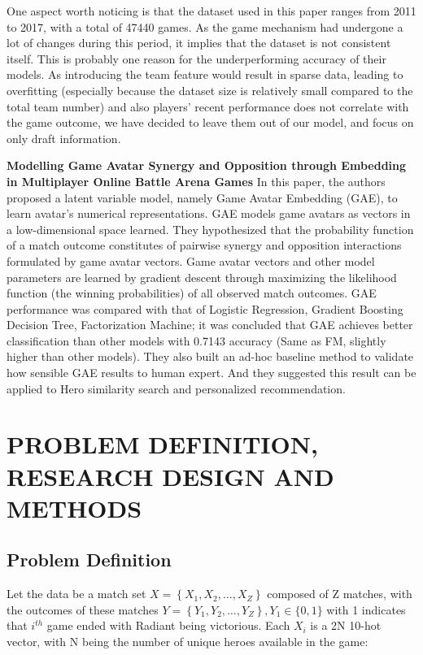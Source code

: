 \documentclass{article}
\begin{document}
One aspect worth noticing is that the dataset used in this paper ranges from 2011 to 2017, with a total of 47440 games. As the game mechanism had undergone a lot of changes during this period, it implies that the dataset is not consistent itself. This is probably one reason for the underperforming accuracy of their models. As introducing the team feature would result in sparse data, leading to overfitting (especially because the dataset size is relatively small compared to the total team number) and also players’ recent performance does not correlate with the game outcome, we have decided to leave them out of our model, and focus on only draft information.

\textbf{Modelling Game Avatar Synergy and Opposition through Embedding in Multiplayer Online Battle Arena Games\cite{chen2018modeling}}
In this paper, the authors proposed a latent variable model, namely Game Avatar Embedding (GAE), to learn avatar’s numerical representations. GAE models game avatars as vectors in a low-dimensional space learned. They hypothesized that the probability function of a match outcome constitutes of pairwise synergy and opposition interactions formulated by game avatar vectors. Game avatar vectors and other model parameters are learned by gradient descent through maximizing the likelihood function (the winning probabilities) of all observed match outcomes. GAE performance was compared with that of Logistic Regression, Gradient Boosting Decision Tree, Factorization Machine; it was concluded that GAE achieves better classification than other models with 0.7143 accuracy (Same as FM, slightly higher than other models). They also built an ad-hoc baseline method to validate how sensible GAE results to human expert. And they suggested this result can be applied to Hero similarity search and personalized recommendation.

\section{PROBLEM DEFINITION, RESEARCH DESIGN AND METHODS}

\subsection{Problem Definition}
Let the data be a match set $X = \left\{ X _ { 1 } , X _ { 2 } , \dots , X _ { Z } \right\}$ composed of Z matches, with the outcomes of these matches $Y = \left\{ Y _ { 1 } , Y _ { 2 } , \dots , Y _ { Z } \right\} , Y _ { 1 } \in \{ 0,1 \}$ with 1 indicates that $i^{th}$ game ended with Radiant being victorious. Each $X_i$ is a 2N 10-hot vector, with N being the number of unique heroes available in the game:
\end{document}
